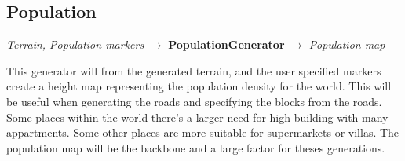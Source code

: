 \subsection{Population}
\begin{center}
    \textit{Terrain, Population markers} $\rightarrow$ \textbf{PopulationGenerator} $\rightarrow$ \textit{Population map} 
\end{center}
This generator will from the generated terrain, and the user specified markers create a height map representing the population density for the world.
This will be useful when generating the roads and specifying the blocks from the roads. 
Some places within the world there's a larger need for high building with many appartments. 
Some other places are more suitable for supermarkets or villas. 
The population map will be the backbone and a large factor for theses generations. 